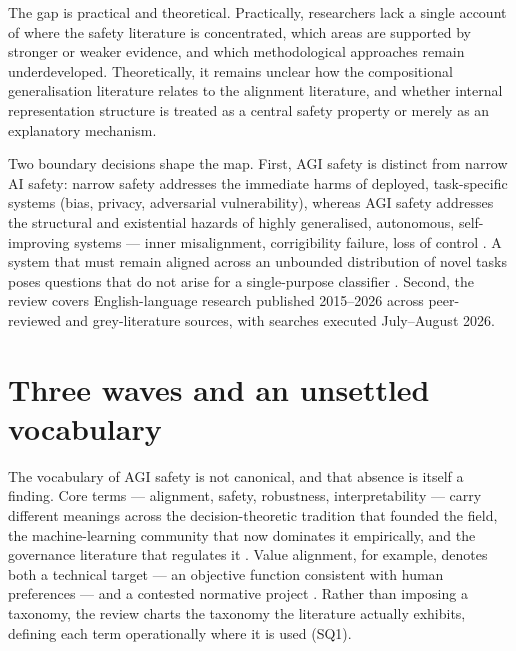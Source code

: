 The gap is practical and theoretical. Practically, researchers lack a single account of
where the safety literature is concentrated, which areas are supported by stronger or
weaker evidence, and which methodological approaches remain underdeveloped.
Theoretically, it remains unclear how the compositional generalisation literature
relates to the alignment literature, and whether internal representation structure is
treated as a central safety property or merely as an explanatory mechanism.

Two boundary decisions shape the map. First, AGI safety is distinct from narrow AI
safety: narrow safety addresses the immediate harms of deployed, task-specific systems
(bias, privacy, adversarial vulnerability), whereas AGI safety addresses the structural
and existential hazards of highly generalised, autonomous, self-improving systems
--- inner misalignment, corrigibility failure, loss of control
\citep{hendrycks2023overview,russell2019human,bostrom2014superintelligence}. A system
that must remain aligned across an unbounded distribution of novel tasks poses
questions that do not arise for a single-purpose classifier \citep{russell2019human}.
Second, the review covers English-language research published 2015--2026 across
peer-reviewed and grey-literature sources, with searches executed July--August 2026.

\section{Three waves and an unsettled vocabulary}

The vocabulary of AGI safety is not canonical, and that absence is itself a finding.
Core terms --- alignment, safety, robustness, interpretability --- carry different
meanings across the decision-theoretic tradition that founded the field, the
machine-learning community that now dominates it empirically, and the governance
literature that regulates it \citep{bostrom2014superintelligence,russell2019human,
hendrycks2023overview}. Value alignment, for example, denotes both a technical target
--- an objective function consistent with human preferences \citep{amodei2016concrete}
--- and a contested normative project \citep{triantafyllopoulos2026value}. Rather than
imposing a taxonomy, the review charts the taxonomy the literature actually exhibits,
defining each term operationally where it is used (SQ1).


